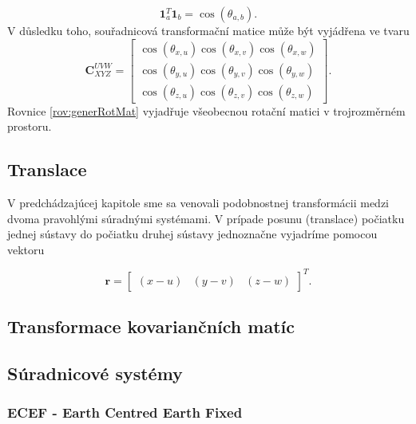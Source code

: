\documentclass[11pt,a4paper]{article}
\begin{document}
\begin{equation}
\mathbf{1}^{T}_{a}\mathbf{1}_{b} = \cos{\left(\theta_{a, b}\right)}.
\end{equation}
V důsledku toho, souřadnicová transformační matice může být vyjádřena ve tvaru
\begin{equation}
\mathbf{C}_{XYZ}^{UVW} = 
\begin{bmatrix}
\cos{\left(\theta_{x,u}\right)} \cos{\left(\theta_{x,v}\right)} \cos{\left(\theta_{x,w}\right)} \\
\cos{\left(\theta_{y,u}\right)} \cos{\left(\theta_{y,v}\right)} \cos{\left(\theta_{y,w}\right)} \\
\cos{\left(\theta_{z,u}\right)} \cos{\left(\theta_{z,v}\right)} \cos{\left(\theta_{z,w}\right)} 
\end{bmatrix}.
\label{rov:generRotMat}
\end{equation}
Rovnice \ref{rov:generRotMat} vyjadřuje všeobecnou rotační matici v trojrozměrném prostoru.

\subsection{Translace}

V predchádzajúcej kapitole sme sa venovali podobnostnej transformácii medzi dvoma pravohlými súradnými systémami. V prípade posunu (translace) počiatku jednej sústavy do počiatku druhej sústavy jednoznačne vyjadríme pomocou vektoru

\begin{equation}
\mathbf{r} = 
\begin{bmatrix}
\left(x-u\right) & \left(y-v\right) & \left(z-w\right)
\end{bmatrix}^{T}.
\end{equation}

\subsection{Transformace kovariančních matíc}

\subsection{Súradnicové systémy}


\subsubsection{ECEF - Earth Centred Earth Fixed}
\end{document}
